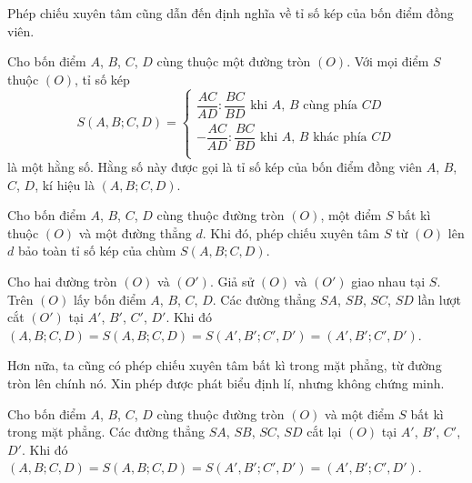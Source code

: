         Phép chiếu xuyên tâm cũng dẫn đến định nghĩa về tỉ số kép của bốn điểm đồng viên.

        \begin{definition}
            Cho bốn điểm \(A\), \(B\), \(C\), \(D\) cùng thuộc một đường tròn \((O)\). Với mọi điểm \(S\) thuộc \((O)\), tỉ số kép
            \[S(A,B;C,D) = \begin{cases}
                \dfrac{AC}{AD} : \dfrac{BC}{BD} \text{ khi \(A\), \(B\) cùng phía \(CD\)} \\
                - \dfrac{AC}{AD} : \dfrac{BC}{BD} \text{ khi \(A\), \(B\) khác phía \(CD\)} \\
            \end{cases}\]
            là một hằng số. Hằng số này được gọi là tỉ số kép của bốn điểm đồng viên \(A\), \(B\), \(C\), \(D\), kí hiệu là \((A,B;C,D)\).
        \end{definition}

        \begin{corollary}
            Cho bốn điểm \(A\), \(B\), \(C\), \(D\) cùng thuộc đường tròn \((O)\), một điểm \(S\) bất kì thuộc \((O)\) và một đường thẳng \(d\). Khi đó, phép chiếu xuyên tâm \(S\) từ \((O)\) lên \(d\) bảo toàn tỉ số kép của chùm \(S(A,B;C,D)\).
        \end{corollary}

        \begin{corollary}
            Cho hai đường tròn \((O)\) và \((O')\). Giả sử \((O)\) và \((O')\) giao nhau tại \(S\). Trên \((O)\) lấy bốn điểm \(A\), \(B\), \(C\), \(D\). Các đường thẳng \(SA\), \(SB\), \(SC\), \(SD\) lần lượt cắt \((O')\) tại \(A'\), \(B'\), \(C'\), \(D'\). Khi đó \((A,B;C,D) = S(A,B;C,D) = S(A',B';C',D') = (A',B';C',D')\).
        \end{corollary}

        Hơn nữa, ta cũng có phép chiếu xuyên tâm bất kì trong mặt phẳng, từ đường tròn lên chính nó. Xin phép được phát biểu định lí, nhưng không chứng minh.

        \begin{theorem}
            Cho bốn điểm \(A\), \(B\), \(C\), \(D\) cùng thuộc đường tròn \((O)\) và một điểm \(S\) bất kì trong mặt phẳng. Các đường thẳng \(SA\), \(SB\), \(SC\), \(SD\) cắt lại \((O)\) tại \(A'\), \(B'\), \(C'\), \(D'\). Khi đó \((A,B;C,D) = S(A,B;C,D) = S(A',B';C',D') = (A',B';C',D')\).
        \end{theorem}

